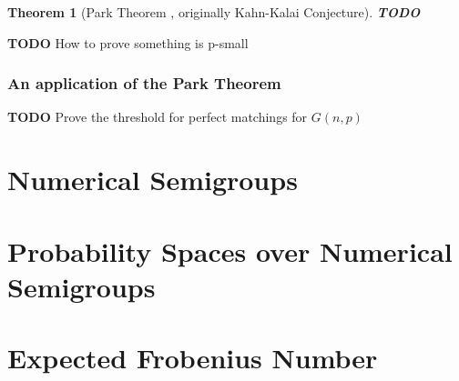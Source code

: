 \documentclass[12pt]{article}
\newtheorem{theorem}{Theorem}[section]
\theoremstyle{definition}
\theoremstyle{remark}
\begin{document}
\begin{theorem}[Park Theorem \cite{park2022proof}, originally Kahn-Kalai Conjecture]
\textbf{TODO}
\end{theorem}

\textbf{TODO} How to prove something is p-small

\subsubsection{An application of the Park Theorem}

\noindent \textbf{TODO} Prove the threshold for perfect matchings for $G(n, p)$

\section{Numerical Semigroups}


\section{Probability Spaces over Numerical Semigroups}

\section{Expected Frobenius Number}



\end{document}
